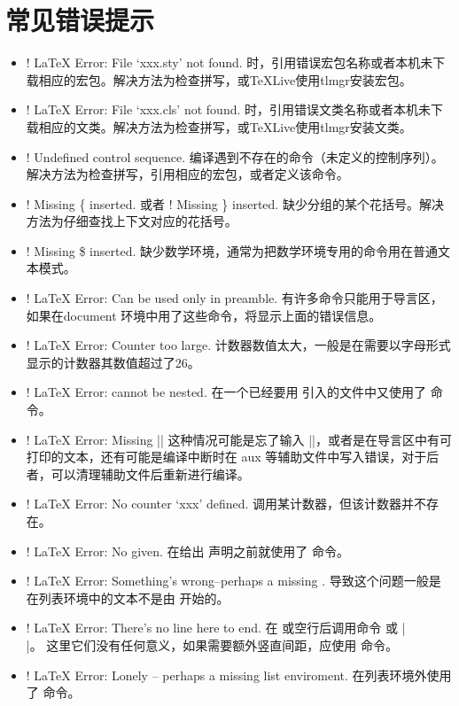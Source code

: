 
\section{常见错误提示}

\begin{itemize}
  \item
    ! LaTeX Error: File `xxx.sty' not found.
    时，引用错误宏包名称或者本机未下载相应的宏包。解决方法为检查拼写，或TeXLive使用tlmgr安装宏包。
  \item
    ! LaTeX Error: File `xxx.cls' not found.
    时，引用错误文类名称或者本机未下载相应的文类。解决方法为检查拼写，或TeXLive使用tlmgr安装文类。
  \item
    ! Undefined control sequence.
    编译遇到不存在的命令（未定义的控制序列）。解决方法为检查拼写，引用相应的宏包，或者定义该命令。
  \item
    ! Missing \{ inserted. 或者 ! Missing \} inserted.
    缺少分组的某个花括号。解决方法为仔细查找上下文对应的花括号。
  \item
    ! Missing \$ inserted.
    缺少数学环境，通常为把数学环境专用的命令用在普通文本模式。
  \item
    ! LaTeX Error: Can be used only in preamble.
    有许多命令只能用于导言区，如果在document
    环境中用了这些命令，将显示上面的错误信息。
  \item
    ! LaTeX Error: Counter too large.
    计数器数值太大，一般是在需要以字母形式显示的计数器其数值超过了26。
  \item
    ! LaTeX Error:  cannot be nested.
    在一个已经要用  引入的文件中又使用了
     命令。
  \item
    ! LaTeX Error: Missing ||
    这种情况可能是忘了输入 ||，或者是在导言区中有可打印的文本，还有可能是编译中断时在
    aux 等辅助文件中写入错误，对于后者，可以清理辅助文件后重新进行编译。
  \item
    ! LaTeX Error: No counter `xxx' defined.
    调用某计数器，但该计数器并不存在。
  \item
    ! LaTeX Error: No  given. 在给出
     声明之前就使用了  命令。
  \item
    ! LaTeX Error: Something's wrong--perhaps a missing .
    导致这个问题一般是在列表环境中的文本不是由  开始的。
  \item
    ! LaTeX Error: There's no line here to end.
    在  或空行后调用命令  或 |\\|。
    这里它们没有任何意义，如果需要额外竖直间距，应使用  命令。
  \item
    ! LaTeX Error: Lonely  -- perhaps a missing list enviroment.
    在列表环境外使用了  命令。
\end{itemize}
